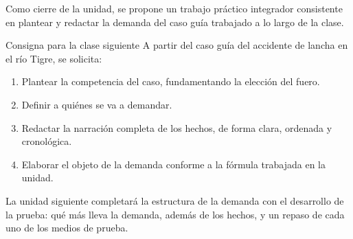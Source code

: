 \documentclass[12pt,oneside]{book}
\begin{document}
Como cierre de la unidad, se propone un trabajo práctico integrador consistente en plantear y redactar la demanda del caso guía trabajado a lo largo de la clase.

\begin{exercise}{Consigna para la clase siguiente}
A partir del caso guía del accidente de lancha en el río Tigre, se solicita:

\begin{enumerate}
    \item Plantear la competencia del caso, fundamentando la elección del fuero.
    \item Definir a quiénes se va a demandar.
    \item Redactar la narración completa de los hechos, de forma clara, ordenada y cronológica.
    \item Elaborar el objeto de la demanda conforme a la fórmula trabajada en la unidad.
\end{enumerate}
\end{exercise}

\begin{note}
La unidad siguiente completará la estructura de la demanda con el desarrollo de la prueba: qué más lleva la demanda, además de los hechos, y un repaso de cada uno de los medios de prueba.
\end{note}
\end{document}
